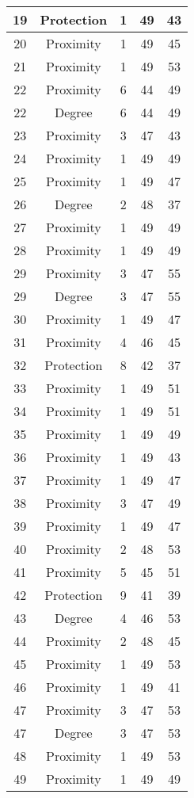 \documentclass[results.tex]{subfiles}
\begin{document}
\begin{center}
\begin{tabular}{| c || c | c | c | c |}
    \hline
    19 & Protection & 1 & 49 & 43 \\ 
    \hline
    20 & Proximity & 1 & 49 & 45 \\ 
    \hline
    21 & Proximity & 1 & 49 & 53 \\ 
    \hline
    22 & Proximity & 6 & 44 & 49 \\ 
    \hline
    22 & Degree & 6 & 44 & 49 \\ 
    \hline
    23 & Proximity & 3 & 47 & 43 \\ 
    \hline
    24 & Proximity & 1 & 49 & 49 \\ 
    \hline
    25 & Proximity & 1 & 49 & 47 \\ 
    \hline
    26 & Degree & 2 & 48 & 37 \\ 
    \hline
    27 & Proximity & 1 & 49 & 49 \\ 
    \hline
    28 & Proximity & 1 & 49 & 49 \\ 
    \hline
    29 & Proximity & 3 & 47 & 55 \\ 
    \hline
    29 & Degree & 3 & 47 & 55 \\ 
    \hline
    30 & Proximity & 1 & 49 & 47 \\ 
    \hline
    31 & Proximity & 4 & 46 & 45 \\ 
    \hline
    32 & Protection & 8 & 42 & 37 \\ 
    \hline
    33 & Proximity & 1 & 49 & 51 \\ 
    \hline
    34 & Proximity & 1 & 49 & 51 \\ 
    \hline
    35 & Proximity & 1 & 49 & 49 \\ 
    \hline
    36 & Proximity & 1 & 49 & 43 \\ 
    \hline
    37 & Proximity & 1 & 49 & 47 \\ 
    \hline
    38 & Proximity & 3 & 47 & 49 \\ 
    \hline
    39 & Proximity & 1 & 49 & 47 \\ 
    \hline
    40 & Proximity & 2 & 48 & 53 \\ 
    \hline
    41 & Proximity & 5 & 45 & 51 \\ 
    \hline
    42 & Protection & 9 & 41 & 39 \\ 
    \hline
    43 & Degree & 4 & 46 & 53 \\ 
    \hline
    44 & Proximity & 2 & 48 & 45 \\ 
    \hline
    45 & Proximity & 1 & 49 & 53 \\ 
    \hline
    46 & Proximity & 1 & 49 & 41 \\ 
    \hline
    47 & Proximity & 3 & 47 & 53 \\ 
    \hline
    47 & Degree & 3 & 47 & 53 \\ 
    \hline
    48 & Proximity & 1 & 49 & 53 \\ 
    \hline
    49 & Proximity & 1 & 49 & 49 \\ 
    \hline   \end{tabular}
\end{center}
\end{document}
